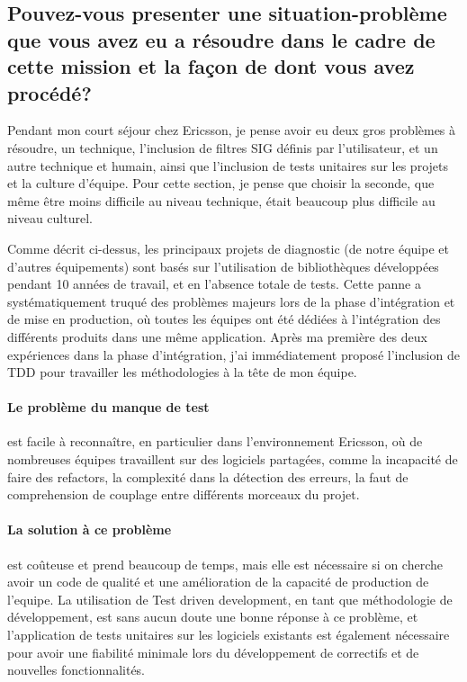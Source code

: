 \documentclass{resume} %
\begin{document}
\subsection{Pouvez-vous presenter une situation-problème que vous avez eu a résoudre dans le cadre de cette mission et la façon de dont vous avez procédé?}

	Pendant mon court séjour chez Ericsson, je pense avoir eu deux gros problèmes à résoudre, un technique, l'inclusion de filtres SIG définis par l'utilisateur, et un autre technique et humain, ainsi que l'inclusion de tests unitaires sur les projets et la culture d'équipe.
Pour cette section, je pense que choisir la seconde, que même être moins difficile au niveau technique, était beaucoup plus difficile au niveau culturel.

Comme décrit ci-dessus, les principaux projets de diagnostic (de notre équipe et d'autres équipements) sont basés sur l'utilisation de bibliothèques développées pendant 10 années de travail, et en l'absence totale de tests.
Cette panne a systématiquement truqué des problèmes majeurs lors de la phase d'intégration et de mise en production, où toutes les équipes ont été dédiées à l'intégration des différents produits dans une même application.
Après ma première des deux expériences dans la phase d'intégration, j'ai immédiatement proposé l'inclusion de TDD pour travailler les méthodologies à la tête de mon équipe.

\paragraph {Le problème du manque de test} est facile à reconnaître, en particulier dans l'environnement Ericsson, où de nombreuses équipes travaillent sur des logiciels partagées, comme la incapacité de faire des refactors, la complexité dans la détection des erreurs, la faut de comprehension de couplage entre différents morceaux du projet.

\paragraph {La solution à ce problème} est coûteuse et prend beaucoup de temps, mais elle est nécessaire si on cherche avoir un code de qualité et une amélioration de la capacité de production de l'equipe. La utilisation de Test driven development, en tant que méthodologie de développement, est sans aucun doute une bonne réponse à ce problème, et l'application de tests unitaires sur les logiciels existants est également nécessaire pour avoir une fiabilité minimale lors du développement de correctifs et de nouvelles fonctionnalités.
\end{document}
